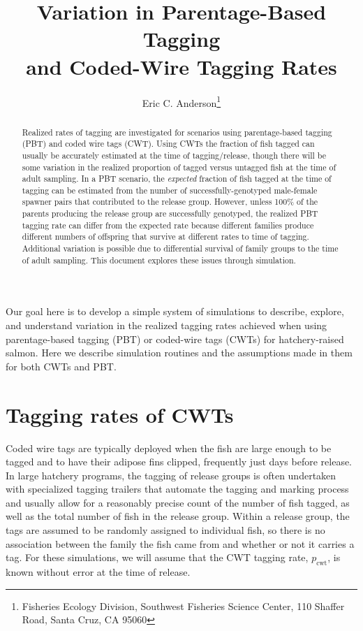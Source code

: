 \documentclass[11pt]{article}
\title{Variation in Parentage-Based Tagging \\
and Coded-Wire  Tagging  Rates}
\author{Eric C. Anderson\thanks{
    Fisheries Ecology Division, 
    Southwest Fisheries Science Center, 
    110 Shaffer Road,
    Santa Cruz, CA 95060}
}
\begin{document}
\maketitle


\begin{abstract}
Realized rates of tagging are investigated for scenarios using parentage-based tagging (PBT)
and coded wire tags (CWT).  
Using CWTs the fraction of fish tagged can usually be accurately
estimated at the time of tagging/release, though there will be some variation in the realized
proportion of tagged versus untagged fish at the time of adult sampling.  In a PBT
scenario, the {\em expected} fraction of fish tagged at the time of tagging can be
estimated from the number of successfully-genotyped male-female spawner pairs that
contributed to the release group.  However, unless 100\% of the parents producing the release
group are successfully genotyped, the realized PBT tagging rate can differ from the
expected rate because different families produce different numbers of offspring that survive
at different rates to time of tagging.  Additional variation is possible due to differential
survival of family groups to the time of adult sampling.  This document explores these issues
through simulation.
\end{abstract}



Our goal here is to develop a simple system of simulations to describe, explore, and understand
variation in the realized tagging rates achieved when using parentage-based tagging (PBT)
or coded-wire tags (CWTs) for hatchery-raised salmon.  Here we describe simulation routines
and the assumptions made in them for both CWTs and PBT.

\section{Tagging rates of CWTs}
Coded wire tags are typically deployed
when the fish are large enough to be tagged and to have their adipose fins clipped, frequently
just days before release.  In large hatchery programs, the tagging of release
groups is often undertaken with specialized tagging trailers that automate the tagging and marking
process and usually allow for a reasonably precise count of the number of fish tagged,
as well as the total number of fish in the release group.  Within a release group, the tags are
assumed to be randomly assigned to individual fish, so there is no association between the family
the fish came from and whether or not it carries a tag.  For these simulations, we will assume
that the CWT tagging rate, $p_\mathrm{cwt}$, is known without error at the time of release.  
\end{document}
